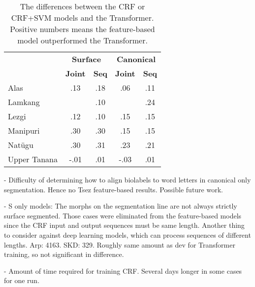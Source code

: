 \begin{table}
    \centering
    \begin{tabular}{l|cc|cc}
        & \multicolumn{2}{c|}{\textbf{Surface}} & \multicolumn{2}{c}{\textbf{Canonical}} \\
        & \textbf{Joint} & \textbf{Seq} & \textbf{Joint} & \textbf{Seq} \\
        \hline
        Alas & .13 & .18 & .06 & .11 \\
        \hline
        Lamkang &  & .10 &  & .24 \\
        \hline
        Lezgi & .12 & .10 & .15 & .15 \\
        \hline
        Manipuri & .30 & .30 & .15 & .15 \\
        \hline
        Nat\"ugu & .30 & .31 & .23 & .21 \\
        \hline
        Upper Tanana & -.01 & .01 & -.03 & .01 \\
    \end{tabular}
    \caption[F$_1$-score Differences of Feature-based Models minus Deep Learning]{The differences between the CRF or CRF+SVM models and the Transformer. Positive numbers means the feature-based model outperformed the Transformer.}
    \label{tab:DLFtrResults}
\end{table}

- Difficulty of determining how to align biolabels to word letters in canonical only segmentation. Hence no Tsez feature-based results. Possible future work.

- S only models: The morphs on the segmentation line are not always strictly surface segmented. Those cases were eliminated from the feature-based models since the CRF input and output sequences must be same length. Another thing to consider against deep learning models, which can process sequences of different lengths. Arp: 4163. SKD: 329. Roughly same amount as dev for Transformer training, so not significant in difference. 

- Amount of time required for training CRF. Several days longer in some cases for one run.

